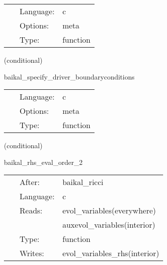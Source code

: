 \hspace{5mm}

 \begin{tabular*}{160mm}{cll} 
~ & Language:  & c \\ 
~ & Options:  & meta \\ 
~ & Type:  & function \\ 
\end{tabular*} 


\vspace{5mm}

   (conditional) 

\hspace{5mm} baikal\_specify\_driver\_boundaryconditions 

\hspace{5mm}{\it register boundary conditions in presync bin driver\_boundaryselect. } 


\hspace{5mm}

 \begin{tabular*}{160mm}{cll} 
~ & Language:  & c \\ 
~ & Options:  & meta \\ 
~ & Type:  & function \\ 
\end{tabular*} 


\vspace{5mm}

   (conditional) 

\hspace{5mm} baikal\_rhs\_eval\_order\_2 

\hspace{5mm}{\it evaluate bssn rhss, at finite-differencing order 2 } 


\hspace{5mm}

 \begin{tabular*}{160mm}{cll} 
~ & After:  & baikal\_ricci \\ 
~ & Language:  & c \\ 
~ & Reads:  & evol\_variables(everywhere) \\ 
~& ~ &auxevol\_variables(interior)\\ 
~ & Type:  & function \\ 
~ & Writes:  & evol\_variables\_rhs(interior) \\ 
\end{tabular*} 


\vspace{5mm}

